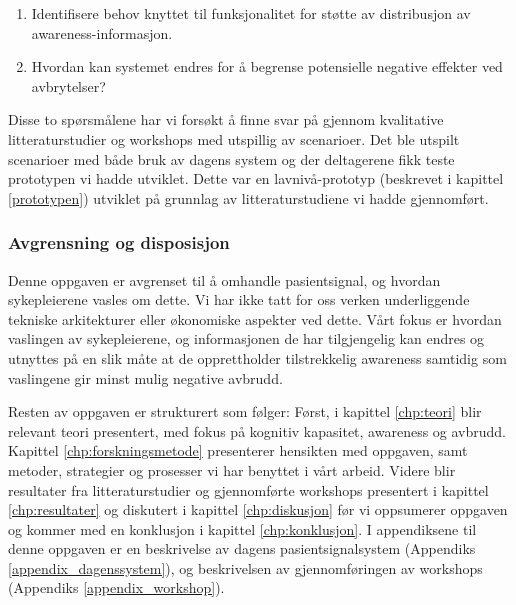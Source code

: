 \begin{enumerate}
  \item Identifisere behov knyttet til funksjonalitet for støtte av distribusjon av awareness-informasjon.
  \item Hvordan kan systemet endres for å begrense potensielle negative effekter ved avbrytelser?
\end{enumerate}

\noindent
Disse to spørsmålene har vi forsøkt å finne svar på gjennom kvalitative litteraturstudier og workshops med utspillig av scenarioer. Det ble utspilt scenarioer med både bruk av dagens system og der deltagerene fikk teste prototypen vi hadde utviklet. Dette var en lavnivå-prototyp (beskrevet i kapittel \ref{prototypen}) utviklet på grunnlag av litteraturstudiene vi hadde gjennomført.

\subsubsection{Avgrensning og disposisjon}
Denne oppgaven er avgrenset til å omhandle pasientsignal, og hvordan sykepleierene vasles om dette. Vi har ikke tatt for oss verken underliggende tekniske arkitekturer eller økonomiske aspekter ved dette. Vårt fokus er hvordan vaslingen av sykepleierene, og informasjonen de har tilgjengelig kan endres og utnyttes på en slik måte at de opprettholder tilstrekkelig awareness samtidig som vaslingene gir minst mulig negative avbrudd.

\noindent
Resten av oppgaven er strukturert som følger: Først, i kapittel \ref{chp:teori} blir relevant teori presentert, med fokus på kognitiv kapasitet, awareness og avbrudd. Kapittel \ref{chp:forskningsmetode} presenterer hensikten med oppgaven, samt metoder, strategier og prosesser vi har benyttet i vårt arbeid. Videre blir resultater fra litteraturstudier og gjennomførte workshops presentert i kapittel \ref{chp:resultater} og diskutert i kapittel \ref{chp:diskusjon} før vi oppsumerer oppgaven og kommer med en konklusjon i kapittel \ref{chp:konklusjon}. I appendiksene til denne oppgaven er en beskrivelse av dagens pasientsignalsystem (Appendiks \ref{appendix_dagenssystem}), og beskrivelsen av gjennomføringen av workshops (Appendiks \ref{appendix_workshop}).